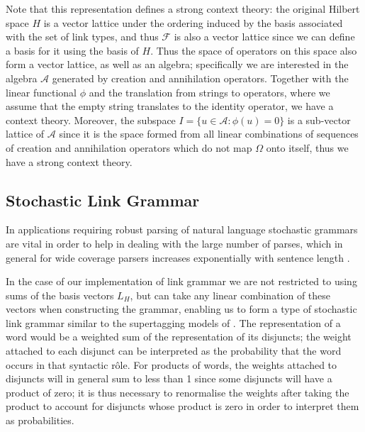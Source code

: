Note that this representation defines a strong context theory: the original Hilbert space $H$ is a vector lattice under the ordering induced by the basis associated with the set of link types, and thus $\mathcal{F}$ is also a vector lattice since we can define a basis for it using the basis of $H$. Thus the space of operators on this space also form a vector lattice, as well as an algebra; specifically we are interested in the algebra $\mathcal{A}$ generated by creation and annihilation operators. Together with the linear functional $\phi$ and the translation from strings to operators, where we assume that the empty string translates to the identity operator, we have a context theory. Moreover, the subspace $I = \{u \in \mathcal{A} : \phi(u) = 0\}$ is a sub-vector lattice of $\mathcal{A}$ since it is the space formed from all linear combinations of sequences of creation and annihilation operators which do not map $\Omega$ onto itself, thus we have a strong context theory.


\subsection{Stochastic Link Grammar}
\label{stochastic-link-grammar-section}

In applications requiring robust parsing of natural language stochastic grammars are vital in order to help in dealing with the large number of parses, which in general for wide coverage parsers increases exponentially with sentence length \citep{Manning:99}.

In the case of our implementation of link grammar we are not restricted to using sums of the basis vectors $L_H$, but can take any linear combination of these vectors when constructing the grammar, enabling us to form a type of stochastic link grammar similar to the supertagging models of \cite{Bangalore:99}. The representation of a word would be a weighted sum of the representation of its disjuncts; the weight attached to each disjunct can be interpreted as the probability that the word occurs in that syntactic r\^ole. For products of words, the weights attached to disjuncts will in general sum to less than 1 since some disjuncts will have a product of zero; it is thus necessary to renormalise the weights after taking the product to account for disjuncts whose product is zero in order to interpret them as probabilities.

